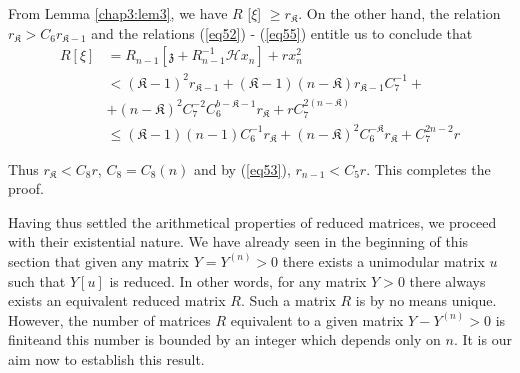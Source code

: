 From Lemma \ref{chap3:lem3}, we have $R$ [$\xi$] $\ge r_\mathfrak{K}
$. On the other 
hand, the relation $ r_\mathfrak{K} > C_6  r_{\mathfrak{K} - 1 } $ and
the relations (\ref{eq52}) - (\ref{eq55}) entitle us to conclude that  
\begin{align*}
R [ \xi ] &=  R_{n-1} [ \mathfrak{z} + R^{-1}_{n-1} \mathscr{H} x_n ]
+ rx^2_n \\ 
&< ( \mathfrak{K} -1 )^2 r_{\mathfrak{K} - 1} + ( \mathfrak{K} -1 ) ( n -
\mathfrak{K} ) r_{\mathfrak{K} - 1 } C^{-1}_7 + \\ 
&+ ( n - \mathfrak{K} )^2 C^{-2}_7 C^{b - \mathfrak{K} -1}_6
r_\mathfrak{K} + r C^{2 (n-\mathfrak{K})}_7 \\ 
&\leq ( \mathfrak{K} - 1 ) ( n -1 ) C^{-1}_6  r_\mathfrak{K} + ( n -
\mathfrak{K} )^2 C^{-\mathfrak{K}}_6 r_\mathfrak{K} + C^{2 n-2}_{7}r 
\end{align*}

Thus $ r_\mathfrak{K} < C_8 r$, $C_8 = C_8 (n) $ and by  (\ref{eq53}), $r_{n-1} <
C_5 r$. This completes the proof. 

Having thus settled the arithmetical properties of reduced matrices,
we proceed with their existential nature. We have already seen in the
beginning of this section that given any matrix $ Y =
Y^{(n)} > 0 $ there exists a unimodular  matrix $u$
such that $Y[u]$ is reduced. In other words, for
any matrix $Y > 0$ there always exists an equivalent  reduced
matrix $R$. Such a matrix $R$ is by no means unique. However, the
number of matrices $R$ equivalent to a given matrix $Y -
Y^{(n)}  > 0 $ is finite\pageoriginale and this number is bounded by
an integer which depends only on $n$. It is our aim now to establish
this result.   

